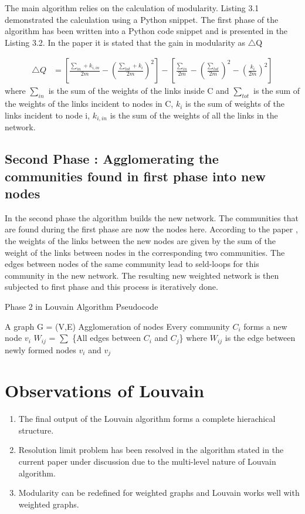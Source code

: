 \par The main algorithm relies on the calculation of modularity. Listing 3.1 demonstrated the calculation using a Python snippet. The first phase of the algorithm has been written into a Python code snippet and is presented in the Listing 3.2. 
In the paper it is stated that the gain in modularity as $\bigtriangleup$Q

\begin{equation}
\begin{split}
\bigtriangleup Q &= \left[ \frac{\sum_{in} + k_{i,in}}{2m} - \left( \frac{\sum_{tot} + k_{i}}{2m} \right)^2 \right] - \left[ \frac{\sum_{in}}{2m} - \left( \frac{\sum_{tot}}{2m} \right)^2 - \left( \frac{k_i}{2m} \right)^2 \right]
\end{split}
\end{equation}
where $\sum_{in}$ is the sum of the weights of the links inside C and $\sum_{tot}$ is the sum of the weights of the links incident to nodes in C, $k_i$ is the sum of weights of the links incident to node i, $k_{i,in}$ is the sum of the weights  of all the links in the network.

\subsection{Second Phase : Agglomerating the communities found in first phase into new nodes}
In the second phase the algorithm builds the new network. The communities that are found during the first phase are now the nodes here. According to the paper \cite{Louvain}, the weights of the links between the new nodes are given by the sum of the weight of the links between nodes in the corresponding two communities. The edges between nodes of the same community lead to seld-loops for this community in the new network. The resulting new weighted network is then subjected to first phase  and this process is iteratively done. 
\begin{algorithm}[H]

\caption{Phase 2 in Louvain Algorithm Pseudocode}
\begin{algorithmic} 
\REQUIRE A graph G = (V,E)
\ENSURE Agglomeration of nodes
\STATE Every community $C_i$ forms a new node $v_i$
\STATE $W_{ij}$ = $\sum$ \{All edges between $C_i$ and $C_j$\} where $W_{ij}$ is the edge between newly formed nodes $v_i$ and $v_j$
\end{algorithmic}
\end{algorithm}
\section{Observations of Louvain}
\begin{enumerate}
\item The final output of the Louvain algorithm forms a complete hierachical structure.
\item Resolution limit problem \cite{ResolLimit} has been resolved in the algorithm stated in the current paper under discussion \cite{Louvain} due to the multi-level nature of Louvain algorithm.
\item Modularity can be redefined for weighted graphs and Louvain works well with weighted graphs.
\end{enumerate}

